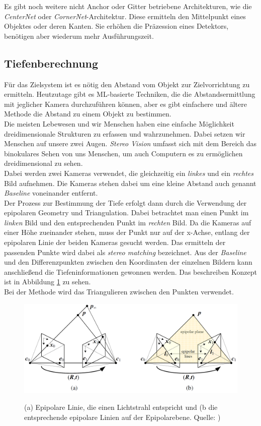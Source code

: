 Es gibt noch weitere nicht Anchor oder Gitter betriebene Architekturen, wie die \textit{CenterNet} oder \textit{CornerNet}-Architektur. Diese ermitteln den Mittelpunkt eines Objektes oder deren Kanten. Sie erhöhen die Präzession eines Detektors, benötigen aber wiederum mehr Ausführungszeit.\cite{yolo_all}

\subsection{Tiefenberechnung}

Für das Zielsystem ist es nötig den Abstand vom Objekt zur Zielvorrichtung zu ermitteln. Heutzutage gibt es \ac{ML}-basierte Techniken, die die Abstandsermittlung mit jeglicher Kamera durchzuführen können, aber es gibt einfachere und ältere Methode die Abstand zu einem Objekt zu bestimmen.
\\
Die meisten Lebewesen und wir Menschen haben eine einfache Möglichkeit dreidimensionale Strukturen zu erfassen und wahrzunehmen. Dabei setzen wir Menschen auf unsere zwei Augen. \textit{Stereo Vision} umfasst sich mit dem Bereich das binokulares Sehen von uns Menschen, um auch Computern es zu ermöglichen dreidimensional zu sehen.
\\
Dabei werden zwei Kameras verwendet, die gleichzeitig ein \textit{linkes} und ein \textit{rechtes} Bild aufnehmen. Die Kameras stehen dabei um eine kleine Abstand auch genannt \textit{Baseline} voneinander entfernt.
\\
Der Prozess zur Bestimmung der Tiefe erfolgt dann durch die Verwendung der epipolaren Geometry und Triangulation. Dabei betrachtet man einen Punkt im \textit{linken} Bild und den entsprechenden Punkt im \textit{rechten} Bild. Da die Kameras auf einer Höhe zueinander stehen, muss der Punkt nur auf der x-Achse, entlang der epipolaren Linie der beiden Kameras gesucht werden. Das ermitteln der passenden Punkte wird dabei als \textit{stereo matching} bezeichnet.
Aus der \textit{Baseline} und den Differenzpunkten zwischen den Koordinaten der einzelnen Bildern kann anschließend die Tiefeninformationen gewonnen werden. Das beschreiben Konzept ist in Abbildung \ref{fig:stereo_depth} zu sehen.
\\
Bei der Methode wird das Triangulieren zwischen den Punkten verwendet.
\cite{stereo_vision}

\begin{figure}[h]
    \centering
    \includegraphics[width=\textwidth]{images/depth_sample.png}
    \label{fig:stereo_depth}
    \caption{(a) Epipolare Linie, die einen Lichtstrahl entspricht und (b die entsprechende epipolare Linien auf der Epipolarebene. Quelle: \cite{cv_Szeliski})}
\end{figure}

